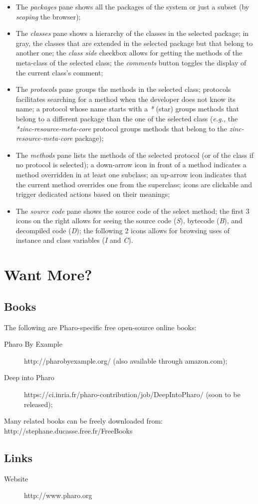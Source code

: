 \documentclass[notumble]{leaflet}
\newcommand{\eg}{\emph{e.g.,}\xspace}
\begin{document}
\begin{itemize}
\item The \emph{packages} pane shows all the packages of the system or
  just a subset (by \emph{scoping} the browser);
\item The \emph{classes} pane shows a hierarchy of the classes in the
  selected package; in gray, the classes that are extended in the
  selected package but that belong to another one; the \emph{class
    side} checkbox allows for getting the methods of the meta-class of
  the selected class; the \emph{comments} button toggles the display
  of the current class's comment;
\item The \emph{protocols} pane groups the methods in the selected
  class; protocols facilitates searching for a method when the
  developer does not know its name; a protocol whose name starts with a
  \emph{*} (star) groups methods that belong to a different package
  than the one of the selected class (\eg the
  \emph{*zinc-resource-meta-core} protocol groups methods that belong
  to the \emph{zinc-resource-meta-core} package);
\item The \emph{methods} pane lists the methods of the selected
  protocol (or of the class if no protocol is selected); a down-arrow
  icon in front of a method indicates a method overridden in at least
  one subclass; an up-arrow icon indicates that the current method
  overrides one from the superclass; icons are clickable and trigger
  dedicated actions based on their meanings;
\item The \emph{source code} pane shows the source code of the select
  method; the first 3 icons on the right allows for seeing the source
  code (\emph{S}), bytecode (\emph{B}), and decompiled code
  (\emph{D}); the following 2 icons allows for browsing uses of
  instance and class variables (\emph{I} and \emph{C}).
\end{itemize}

\section{Want More?}

\subsection{Books}

The following are Pharo-specific free open-source online books:

\begin{description}
\item[Pharo By Example] http://pharobyexample.org/ (also available
  through amazon.com);
\item[Deep into Pharo]
  https://ci.inria.fr/pharo-contribution/job/DeepIntoPharo/ (soon to
  be released);
\end{description}

Many related books can be freely downloaded from:\\[-1em]

\hspace{1em}http://stephane.ducasse.free.fr/FreeBooks

\subsection{Links}

\begin{description}
\item[Website] http://www.pharo.org
\end{description}
\end{document}
